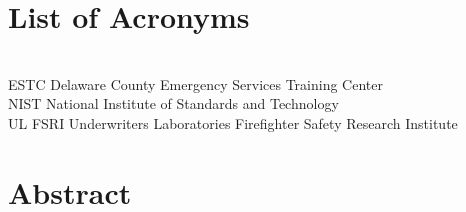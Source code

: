 \documentclass[12pt,oneside]{book}
\begin{document}
\cleardoublepage
{}
{}
\tableofcontents

\cleardoublepage
{}
{}
\listoffigures

\cleardoublepage
{}
{}
\listoftables

\chapter{List of Acronyms}

\begin{tabbing}
\hspace{1.5in} \= \\
ESTC \> Delaware County Emergency Services Training Center \\
NIST \> National Institute of Standards and Technology \\
UL FSRI \> Underwriters Laboratories Firefighter Safety Research Institute
\end{tabbing}

\newpage


\mainmatter


\chapter*{\centering Abstract}
\end{document}
